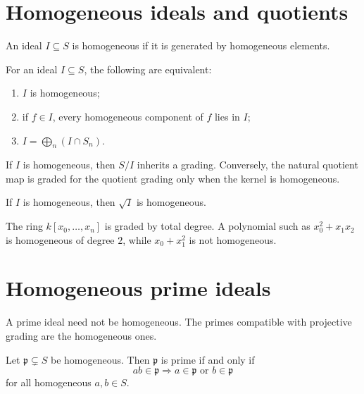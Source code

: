 \section{Homogeneous ideals and quotients}
\begin{definition}
An ideal \(I\subseteq S\) is homogeneous if it is generated by homogeneous elements.
\end{definition}

\begin{proposition}
For an ideal \(I\subseteq S\), the following are equivalent:
\begin{enumerate}
\item \(I\) is homogeneous;
\item if \(f\in I\), every homogeneous component of \(f\) lies in \(I\);
\item \(I=\bigoplus_n(I\cap S_n)\).
\end{enumerate}
\end{proposition}

If \(I\) is homogeneous, then \(S/I\) inherits a grading. Conversely, the natural quotient map is graded for the quotient grading only when the kernel is homogeneous.

\begin{proposition}
If \(I\) is homogeneous, then \(\sqrt I\) is homogeneous.
\end{proposition}



\begin{example}\label{ex:vi34-expand-01}
The ring $k[x_0,\ldots,x_n]$ is graded by total degree.  A polynomial such as $x_0^2+x_1x_2$ is homogeneous of degree $2$, while $x_0+x_1^2$ is not homogeneous.
\end{example}
\section{Homogeneous prime ideals}
A prime ideal need not be homogeneous. The primes compatible with projective grading are the homogeneous ones.

\begin{proposition}
Let \(\mathfrak p\subsetneq S\) be homogeneous. Then \(\mathfrak p\) is prime if and only if
\[
ab\in\mathfrak p\Longrightarrow a\in\mathfrak p\text{ or }b\in\mathfrak p
\]
for all homogeneous \(a,b\in S\).
\end{proposition}

